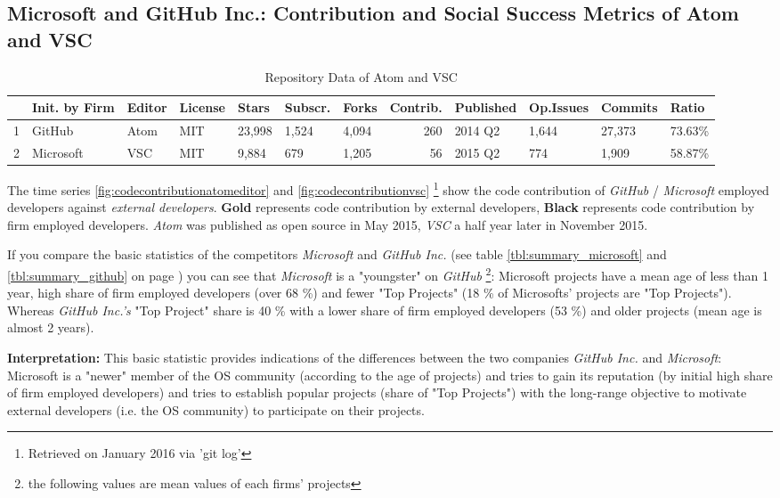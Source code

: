 \subsection{Microsoft and GitHub Inc.: Contribution and Social Success Metrics of Atom and VSC}
\label{sec:atom_vs_vsc}

\begin{table}[!h]
\footnotesize{
\centering
\begin{tabular}{rllllllrllll}
  \hline
 & Init. by Firm & Editor & License & Stars & Subscr. & Forks & Contrib. & Published & Op.Issues & Commits & Ratio \\
  \hline
1 & GitHub & Atom & MIT & 23,998 & 1,524 & 4,094 & 260 & 2014 Q2 & 1,644 & 27,373 & 73.63\% \\
  2 & Microsoft & VSC & MIT & 9,884 & 679 & 1,205 &  56 & 2015 Q2 & 774 & 1,909 & 58.87\% \\
   \hline
\end{tabular}
\label{tbl:dataofvscodeandatom}
\caption[Repository Data of Atom and VSC]{Repository Data of Atom and VSC \protect\footnotemark}
}
\end{table}

The time series \ref{fig:codecontributionatomeditor} and \ref{fig:codecontributionvsc} \footnote{Retrieved on  January 2016 via 'git log'} show the code contribution of \textit{GitHub} / \textit{Microsoft} employed developers against \textit{external developers}. \textbf{Gold} represents code contribution by external developers, \textbf{Black} represents code contribution by firm employed developers. \textit{Atom} was published as open source in May 2015, \textit{VSC} a half year later in November 2015.

If you compare the basic statistics of the competitors \textit{Microsoft} and \textit{GitHub Inc.} (see table \ref{tbl:summary_microsoft} and \ref{tbl:summary_github} on page \pageref{tbl:summary_microsoft}) you can see that \textit{Microsoft} is a "youngster" on \textit{GitHub} \footnote{the following values are mean values of each firms' projects}: Microsoft projects have a mean age of less than 1 year, high share of firm employed developers (over 68 \%) and fewer "Top Projects" (18 \% of Microsofts' projects are "Top Projects"). Whereas \textit{GitHub Inc.'s} "Top Project" share is 40 \% with a lower share of firm employed developers (53 \%) and older projects (mean age is almost 2 years).

\textbf{Interpretation:} This basic statistic provides indications of the differences between the two companies \textit{GitHub Inc.} and \textit{Microsoft}: Microsoft is a "newer" member of the OS community (according to the age of projects) and tries to gain its reputation (by initial high share of firm employed developers) and tries to establish popular projects (share of "Top Projects") with the long-range objective to motivate external developers (i.e. the OS community) to participate on their projects.

